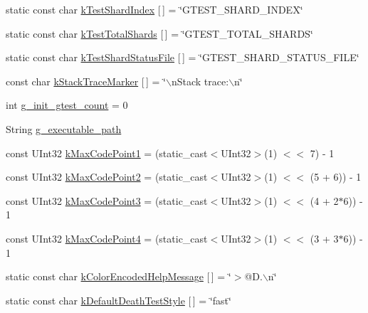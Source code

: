 \begin{DoxyCompactItemize}
static const char \hyperlink{namespacetesting_a34e170fdd4ba4d2f80456cc37e2a8185}{k\-Test\-Shard\-Index} \mbox{[}$\,$\mbox{]} = \char`\"{}\-G\-T\-E\-S\-T\-\_\-\-S\-H\-A\-R\-D\-\_\-\-I\-N\-D\-E\-X\char`\"{}
\item 
static const char \hyperlink{namespacetesting_a9d9ddd278cfbb5834dea812d0de529be}{k\-Test\-Total\-Shards} \mbox{[}$\,$\mbox{]} = \char`\"{}\-G\-T\-E\-S\-T\-\_\-\-T\-O\-T\-A\-L\-\_\-\-S\-H\-A\-R\-D\-S\char`\"{}
\item 
static const char \hyperlink{namespacetesting_a9f1ab5ec024bf19381dff00e824f6ba7}{k\-Test\-Shard\-Status\-File} \mbox{[}$\,$\mbox{]} = \char`\"{}\-G\-T\-E\-S\-T\-\_\-\-S\-H\-A\-R\-D\-\_\-\-S\-T\-A\-T\-U\-S\-\_\-\-F\-I\-L\-E\char`\"{}
\item 
const char \hyperlink{namespacetesting_1_1internal_a735beafdf3dc508442f783a0269ca0f5}{k\-Stack\-Trace\-Marker} \mbox{[}$\,$\mbox{]} = \char`\"{}$\backslash$n\-Stack trace\-:$\backslash$n\char`\"{}
\item 
int \hyperlink{namespacetesting_1_1internal_a5d56c8e20bffcfc3a4c2c1805f815ab5}{g\-\_\-init\-\_\-gtest\-\_\-count} = 0
\item 
\-String \hyperlink{namespacetesting_1_1internal_a00eb28c08b6a4da5387d466add2f742a}{g\-\_\-executable\-\_\-path}
\item 
const \-U\-Int32 \hyperlink{namespacetesting_1_1internal_a842ee44b2d352fa626e9c0cc37486e34}{k\-Max\-Code\-Point1} = (static\-\_\-cast$<$\-U\-Int32$>$(1) $<$$<$ 7) -\/ 1
\item 
const \-U\-Int32 \hyperlink{namespacetesting_1_1internal_af814f29030620a69d0c9e71c5d942990}{k\-Max\-Code\-Point2} = (static\-\_\-cast$<$\-U\-Int32$>$(1) $<$$<$ (5 + 6)) -\/ 1
\item 
const \-U\-Int32 \hyperlink{namespacetesting_1_1internal_a47b4e6ab732c706ac60eb6be97424da9}{k\-Max\-Code\-Point3} = (static\-\_\-cast$<$\-U\-Int32$>$(1) $<$$<$ (4 + 2$\ast$6)) -\/ 1
\item 
const \-U\-Int32 \hyperlink{namespacetesting_1_1internal_acea916a3388da016d05faccd72e51f18}{k\-Max\-Code\-Point4} = (static\-\_\-cast$<$\-U\-Int32$>$(1) $<$$<$ (3 + 3$\ast$6)) -\/ 1
\item 
static const char \hyperlink{namespacetesting_1_1internal_a5d9d2135a9f157ab41418c0e0c3f0b4f}{k\-Color\-Encoded\-Help\-Message} \mbox{[}$\,$\mbox{]} = \char`\"{}$>$@\-D.$\backslash$n\char`\"{}
\item 
static const char \hyperlink{namespacetesting_a44b0987c442d84fba4334420c6b5ea74}{k\-Default\-Death\-Test\-Style} \mbox{[}$\,$\mbox{]} = \char`\"{}fast\char`\"{}

\end{DoxyCompactItemize}
